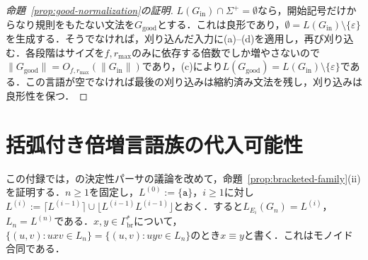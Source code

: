 \documentclass[11pt,a4paper]{ltjsarticle}
\numberwithin{equation}{section}
\theoremstyle{plain}
\theoremstyle{definition}
\theoremstyle{remark}
\newcommand{\eps}{\varepsilon}
\begin{document}
\begin{proof}[命題~\ref{prop:good-normalization}の証明]
$L(G_{\mathrm{in}})\cap\Sigma^+=\emptyset$なら，開始記号だけからなり規則をもたない文法を$G_{\mathrm{good}}$とする．これは良形であり，$\emptyset=L(G_{\mathrm{in}})\setminus\{\eps\}$を生成する．そうでなければ，刈り込んだ入力に(a)--(d)を適用し，再び刈り込む．各段階はサイズを$f,r_{\max}$のみに依存する倍数でしか増やさないので$\|G_{\mathrm{good}}\|=O_{f,r_{\max}}(\|G_{\mathrm{in}}\|)$であり，(c)により$L(G_{\mathrm{good}})=L(G_{\mathrm{in}})\setminus\{\eps\}$である．この言語が空でなければ最後の刈り込みは縮約済み文法を残し，刈り込みは良形性を保つ．
\end{proof}

\section{括弧付き倍増言語族の代入可能性}
\label{app:bracketed-family}

この付録では，\cite{kuriyamaCFG}の決定性パーサの議論を改めて，命題~\ref{prop:bracketed-family}(ii)を証明する．$n\ge1$を固定し，$L^{(0)}:=\{\mathtt a\}$，$i\ge1$に対し$L^{(i)}:=\lceil L^{(i-1)}\rceil\cup\lfloor L^{(i-1)}L^{(i-1)}\rfloor$とおく．すると$L_{E_i}(G_n)=L^{(i)}$，$L_n=L^{(n)}$である．$x,y\in\Gamma_{\mathrm{br}}^*$について，$\{(u,v):uxv\in L_n\}=\{(u,v):uyv\in L_n\}$のとき$x\equiv y$と書く．これはモノイド合同である．
\end{document}

